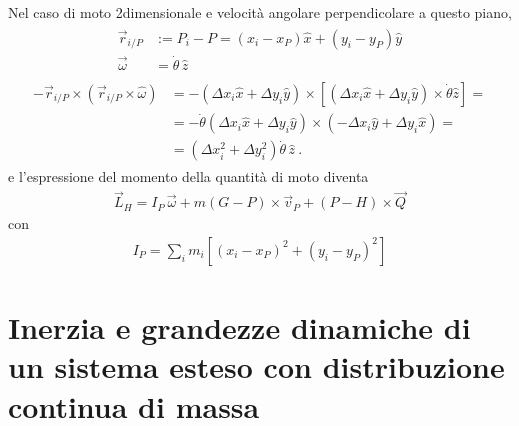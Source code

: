 \documentclass[letterpaper,10pt,italian]{jupyterBook}
\begin{document}
\sphinxAtStartPar
Nel caso di moto 2\sphinxhyphen{}dimensionale e velocità angolare perpendicolare a questo piano, 
\begin{equation*}
\begin{split}\begin{aligned}
  \vec{r}_{i/P} & := P_i - P = \left( x_i - x_P \right) \hat{x} + \left( y_i - y_P \right) \hat{y} \\
  \vec{\omega} & = \dot{\theta} \, \hat{z}
\end{aligned}\end{split}
\end{equation*}\begin{equation*}
\begin{split}\begin{aligned}
  - \vec{r}_{i/P} \times \left( \vec{r}_{i/P} \times \hat{\omega} \right) 
  & = - ( \Delta x_i \hat{x} + \Delta y_i \hat{y} ) \times \left[ ( \Delta x_i \hat{x} + \Delta y_i \hat{y} ) \times \dot{\theta} \hat{z} \right] = \\ 
  & = - \dot{\theta} ( \Delta x_i \hat{x} + \Delta y_i \hat{y} ) \times \left( - \Delta x_i \hat{y} + \Delta y_i \hat{x} \right) = \\
  & = \left( \Delta x_i^2 + \Delta y_i^2 \right) \dot{\theta} \, \hat{z} \ .
\end{aligned}\end{split}
\end{equation*}
\sphinxAtStartPar
e l’espressione del momento della quantità di moto diventa
\begin{equation*}
\begin{split}\vec{L}_{H} = I_P \, \vec{\omega} +  m (G - P) \times \vec{v}_P + \left( P - H \right) \times \vec{Q}\end{split}
\end{equation*}
\sphinxAtStartPar
con
\begin{equation*}
\begin{split}I_P = \sum_i m_i \left[ \left(x_i - x_P\right)^2 + \left(y_i - y_P\right)^2 \right]\end{split}
\end{equation*}
\sphinxstepscope




\section{Inerzia e grandezze dinamiche di un sistema esteso con distribuzione continua di massa}
\label{\detokenize{ch/mechanics/inertia-continuum:inerzia-e-grandezze-dinamiche-di-un-sistema-esteso-con-distribuzione-continua-di-massa}}\label{\detokenize{ch/mechanics/inertia-continuum:physics-hs-mechanics-inertia-continuum}}\label{\detokenize{ch/mechanics/inertia-continuum::doc}}
\end{document}
